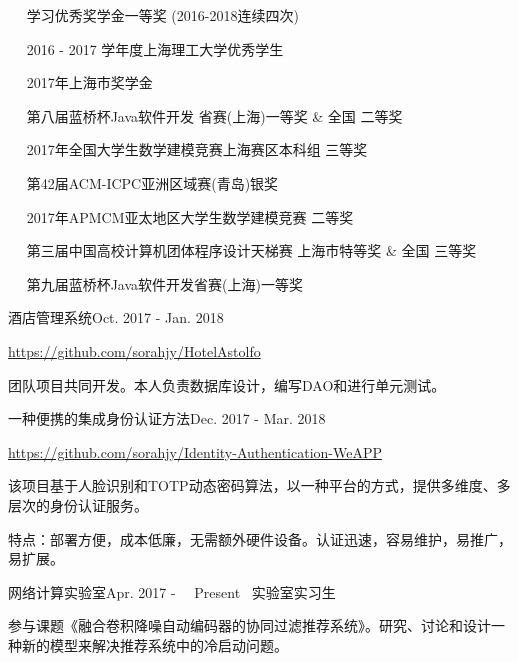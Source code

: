 \documentclass{sorahjy_cv}
\begin{document}
%
%

\begin{description}{}
	\item{\ \ } 学习优秀奖学金一等奖 (2016-2018连续四次)
	\item{\ \ } 2016 - 2017 学年度上海理工大学优秀学生
	\item{\ \ } 2017年上海市奖学金
	\item{\ \ } 第八届蓝桥杯Java软件开发 \quad 省赛(上海){\color{orangeRed}一等奖} \& 全国 {\color{orangeRed}二等奖}
	\item{\ \ } 2017年全国大学生数学建模竞赛上海赛区本科组 {\color{orangeRed}三等奖}
	\item{\ \ } 第42届ACM-ICPC亚洲区域赛(青岛){\color{orangeRed}银奖}
	\item{\ \ } 2017年APMCM亚太地区大学生数学建模竞赛 {\color{orangeRed}二等奖}
	\item{\ \ } 第三届中国高校计算机团体程序设计天梯赛 \quad 上海市{\color{orangeRed}特等奖} \& 全国 {\color{orangeRed}三等奖}
	\item{\ \ } 第九届蓝桥杯Java软件开发省赛(上海){\color{orangeRed}一等奖}
\end{description}


%
%




\begin{sectionContentSimple}{酒店管理系统}{Oct. 2017 - Jan. 2018}
	\item \url{https://github.com/sorahjy/HotelAstolfo}
	\item 团队项目共同开发。本人负责数据库设计，编写DAO和进行单元测试。
\end{sectionContentSimple}


\begin{sectionContentSimple}{一种便携的集成身份认证方法}{Dec. 2017 - Mar. 2018}
	\item \url{https://github.com/sorahjy/Identity-Authentication-WeAPP}
	\item 该项目基于人脸识别和TOTP动态密码算法，以一种平台的方式，提供多维度、多层次的身份认证服务。
	\item 特点：部署方便，成本低廉，无需额外硬件设备。认证迅速，容易维护，易推广，易扩展。
\end{sectionContentSimple}


\begin{sectionContentNormal}{网络计算实验室}{Apr. 2017 - \ \  Present \ }{实验室实习生 \ \ }
	\item 参与课题《融合卷积降噪自动编码器的协同过滤推荐系统》。研究、讨论和设计一种新的模型来解决推荐系统中的冷启动问题。
\end{sectionContentNormal}
\end{document}

